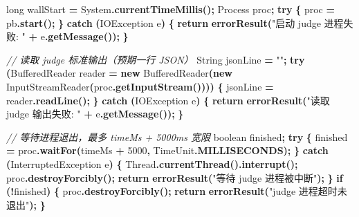 \documentclass[
  11pt,
]{ctexart}
\newenvironment{Shaded}{\begin{snugshade}}{\end{snugshade}}
\newcommand{\BuiltInTok}[1]{#1}
\newcommand{\CommentTok}[1]{\textcolor[rgb]{0.56,0.35,0.01}{\textit{#1}}}
\newcommand{\ControlFlowTok}[1]{\textcolor[rgb]{0.13,0.29,0.53}{\textbf{#1}}}
\newcommand{\DataTypeTok}[1]{\textcolor[rgb]{0.13,0.29,0.53}{#1}}
\newcommand{\DecValTok}[1]{\textcolor[rgb]{0.00,0.00,0.81}{#1}}
\newcommand{\FunctionTok}[1]{\textcolor[rgb]{0.13,0.29,0.53}{\textbf{#1}}}
\newcommand{\KeywordTok}[1]{\textcolor[rgb]{0.13,0.29,0.53}{\textbf{#1}}}
\newcommand{\NormalTok}[1]{#1}
\newcommand{\OperatorTok}[1]{\textcolor[rgb]{0.81,0.36,0.00}{\textbf{#1}}}
\newcommand{\StringTok}[1]{\textcolor[rgb]{0.31,0.60,0.02}{#1}}
\begin{document}
\begin{Shaded}
\begin{Highlighting}[]
        \DataTypeTok{long}\NormalTok{ wallStart }\OperatorTok{=} \BuiltInTok{System}\OperatorTok{.}\FunctionTok{currentTimeMillis}\OperatorTok{();}
        \BuiltInTok{Process}\NormalTok{ proc}\OperatorTok{;}
        \ControlFlowTok{try} \OperatorTok{\{}
\NormalTok{            proc }\OperatorTok{=}\NormalTok{ pb}\OperatorTok{.}\FunctionTok{start}\OperatorTok{();}
        \OperatorTok{\}} \ControlFlowTok{catch} \OperatorTok{(}\BuiltInTok{IOException}\NormalTok{ e}\OperatorTok{)} \OperatorTok{\{}
            \ControlFlowTok{return} \FunctionTok{errorResult}\OperatorTok{(}\StringTok{"启动 judge 进程失败: "} \OperatorTok{+}\NormalTok{ e}\OperatorTok{.}\FunctionTok{getMessage}\OperatorTok{());}
        \OperatorTok{\}}

        \CommentTok{// 读取 judge 标准输出（预期一行 JSON）}
        \BuiltInTok{String}\NormalTok{ jsonLine }\OperatorTok{=} \StringTok{""}\OperatorTok{;}
        \ControlFlowTok{try} \OperatorTok{(}\BuiltInTok{BufferedReader}\NormalTok{ reader }\OperatorTok{=}
                 \KeywordTok{new} \BuiltInTok{BufferedReader}\OperatorTok{(}\KeywordTok{new} \BuiltInTok{InputStreamReader}\OperatorTok{(}\NormalTok{proc}\OperatorTok{.}\FunctionTok{getInputStream}\OperatorTok{())))} \OperatorTok{\{}
\NormalTok{            jsonLine }\OperatorTok{=}\NormalTok{ reader}\OperatorTok{.}\FunctionTok{readLine}\OperatorTok{();}
        \OperatorTok{\}} \ControlFlowTok{catch} \OperatorTok{(}\BuiltInTok{IOException}\NormalTok{ e}\OperatorTok{)} \OperatorTok{\{}
            \ControlFlowTok{return} \FunctionTok{errorResult}\OperatorTok{(}\StringTok{"读取 judge 输出失败: "} \OperatorTok{+}\NormalTok{ e}\OperatorTok{.}\FunctionTok{getMessage}\OperatorTok{());}
        \OperatorTok{\}}

        \CommentTok{// 等待进程退出，最多 timeMs + 5000ms 宽限}
        \DataTypeTok{boolean}\NormalTok{ finished}\OperatorTok{;}
        \ControlFlowTok{try} \OperatorTok{\{}
\NormalTok{            finished }\OperatorTok{=}\NormalTok{ proc}\OperatorTok{.}\FunctionTok{waitFor}\OperatorTok{(}\NormalTok{timeMs }\OperatorTok{+} \DecValTok{5000}\OperatorTok{,} \BuiltInTok{TimeUnit}\OperatorTok{.}\FunctionTok{MILLISECONDS}\OperatorTok{);}
        \OperatorTok{\}} \ControlFlowTok{catch} \OperatorTok{(}\BuiltInTok{InterruptedException}\NormalTok{ e}\OperatorTok{)} \OperatorTok{\{}
            \BuiltInTok{Thread}\OperatorTok{.}\FunctionTok{currentThread}\OperatorTok{().}\FunctionTok{interrupt}\OperatorTok{();}
\NormalTok{            proc}\OperatorTok{.}\FunctionTok{destroyForcibly}\OperatorTok{();}
            \ControlFlowTok{return} \FunctionTok{errorResult}\OperatorTok{(}\StringTok{"等待 judge 进程被中断"}\OperatorTok{);}
        \OperatorTok{\}}
        \ControlFlowTok{if} \OperatorTok{(!}\NormalTok{finished}\OperatorTok{)} \OperatorTok{\{}
\NormalTok{            proc}\OperatorTok{.}\FunctionTok{destroyForcibly}\OperatorTok{();}
            \ControlFlowTok{return} \FunctionTok{errorResult}\OperatorTok{(}\StringTok{"judge 进程超时未退出"}\OperatorTok{);}
        \OperatorTok{\}}


\end{Highlighting}
\end{Shaded}
\end{document}
